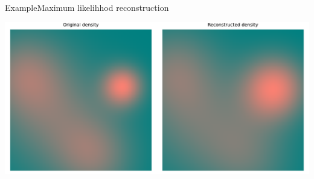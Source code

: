 \documentclass[aspectratio=169]{beamer}
\begin{document}
\begin{frame}{Example}{Maximum likelihhod reconstruction}

			\centering
			\includegraphics[width=0.9\columnwidth]{figuras/maximum_likelihood_reconstruction.pdf}

			
\end{frame}
\end{document}
